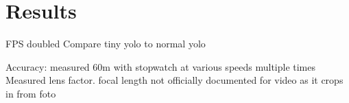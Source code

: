 
\chapter{Results} \label{cha:Results}

FPS doubled
Compare tiny yolo to normal yolo

Accuracy:
measured 60m with stopwatch at various speeds multiple times
Measured lens factor. focal length not officially documented for video as it crops in from foto
